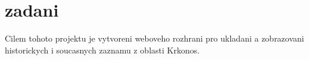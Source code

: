 \chapter{zadani}

Cilem tohoto projektu je vytvoreni weboveho rozhrani
pro ukladani a zobrazovani historickych i soucasnych zaznamu z
oblasti Krkonos.\\
